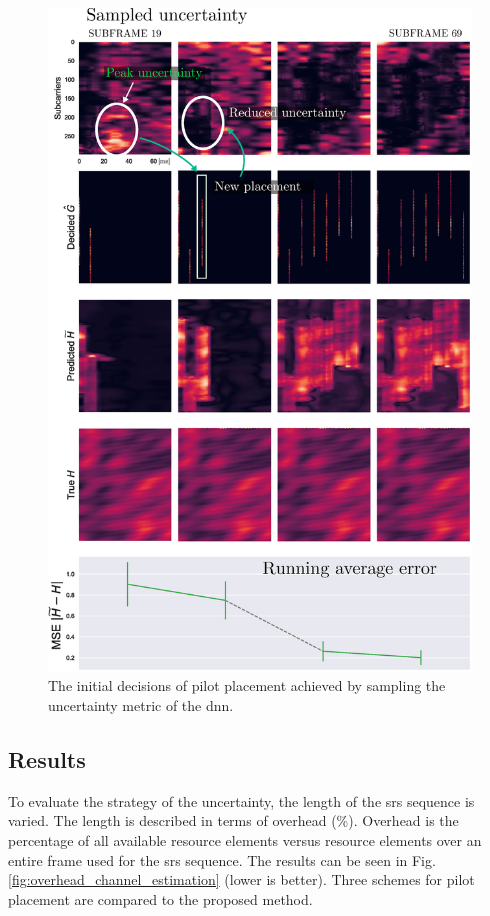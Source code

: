 \begin{figure}
    \centering
    \includegraphics{chapters/part_uplink/figures/results/channel_estimation/decision_example_imshow.eps}
    \caption{The initial decisions of pilot placement achieved by sampling the uncertainty metric of the \gls{dnn}.}
    \label{fig:decision_example}
\end{figure}

\subsection{Results}
To evaluate the strategy of the uncertainty, the length of the  \gls{srs} sequence is varied. The length is described in terms of overhead (\%). Overhead is the percentage of all available resource elements versus resource elements over an entire frame used for the \gls{srs} sequence. The results can be seen in Fig. \ref{fig:overhead_channel_estimation} (lower is better). Three schemes for pilot placement are compared to the proposed method. 

